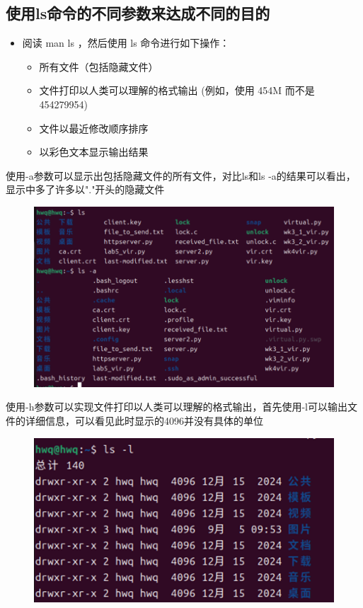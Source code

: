 \documentclass[a4paper, 12pt]{article}
\begin{document}
\subsection{使用ls命令的不同参数来达成不同的目的}
\begin{itemize}
    \item 阅读 man ls ，然后使用 ls 命令进行如下操作：
    \begin{itemize}
        \item 所有文件（包括隐藏文件）
        \item 文件打印以人类可以理解的格式输出 (例如，使用 454M 而不是 454279954)
        \item 文件以最近修改顺序排序
        \item 以彩色文本显示输出结果



 
        
        
        
    \end{itemize}
\end{itemize}\par
使用-a参数可以显示出包括隐藏文件的所有文件，对比ls和ls -a的结果可以看出，显示中多了许多以"."开头的隐藏文件
\begin{figure}[H]
    \centering
    \includegraphics[width=1\linewidth]{shell11.png}
\end{figure}
使用-h参数可以实现文件打印以人类可以理解的格式输出，首先使用-l可以输出文件的详细信息，可以看见此时显示的4096并没有具体的单位
\begin{figure}[H]
    \centering
    \includegraphics[width=1\linewidth]{shell12.png}
\end{figure}
\end{document}
